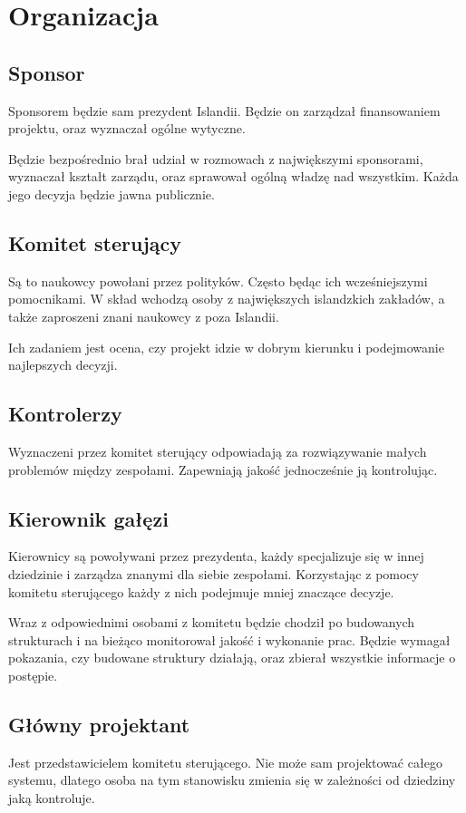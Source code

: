 \section{Organizacja} 
\subsection{Sponsor}
Sponsorem będzie sam prezydent Islandii.
Będzie on zarządzał finansowaniem projektu, oraz wyznaczał ogólne wytyczne.

Będzie bezpośrednio brał udział w rozmowach z największymi sponsorami, wyznaczał kształt zarządu, oraz sprawował ogólną władzę nad wszystkim.
Każda jego decyzja będzie jawna publicznie.

\subsection{Komitet sterujący}
Są to naukowcy powołani przez polityków. Często będąc ich wcześniejszymi pomocnikami.
W skład wchodzą osoby z największych islandzkich zakładów, a także zaproszeni znani naukowcy z poza Islandii.

Ich zadaniem jest ocena, czy projekt idzie w dobrym kierunku i podejmowanie najlepszych decyzji.

\subsection{Kontrolerzy}
Wyznaczeni przez komitet sterujący odpowiadają za rozwiązywanie małych problemów między zespołami.
Zapewniają jakość jednocześnie ją kontrolując.

\subsection{Kierownik gałęzi}
Kierownicy są powoływani przez prezydenta, każdy specjalizuje się w innej dziedzinie i zarządza znanymi dla siebie zespołami.
Korzystając z pomocy komitetu sterującego każdy z nich podejmuje mniej znaczące decyzje.

Wraz z odpowiednimi osobami z komitetu będzie chodził po budowanych strukturach i na bieżąco monitorował jakość i wykonanie prac.
Będzie wymagał pokazania, czy budowane struktury działają, oraz zbierał wszystkie informacje o postępie.

\subsection{Główny projektant}
Jest przedstawicielem komitetu sterującego. Nie może sam projektować całego systemu, dlatego osoba na tym stanowisku zmienia się w zależności od dziedziny jaką kontroluje.

